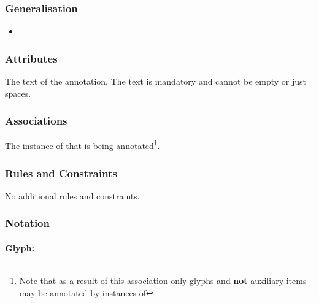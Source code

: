 \subsubsection{Generalisation}

\begin{itemize}
\item {}
\end{itemize}

\subsubsection{Attributes}

\begin{attributes}
   The text of the
  annotation. The text is mandatory and cannot be empty or just
  spaces.
\end{attributes}

\subsubsection{Associations}

\begin{attributes}
   The instance
  of  that is being annotated\footnote{Note that
    as a result of this association only glyphs and \textbf{not}
    auxiliary items may be annotated by instances of
    }.
\end{attributes}

\subsubsection{Rules and Constraints}

No additional rules and constraints.


\subsubsection{Notation}

\paragraph{Glyph: }


